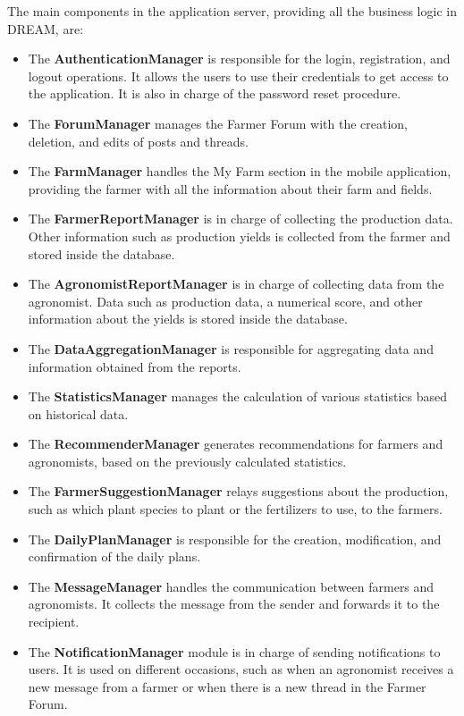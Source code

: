\noindent
The main components in the application server, providing all the business logic in DREAM, are:

\begin{itemize}
	\item The \textbf{AuthenticationManager} is responsible for the login, registration, and logout operations. It allows the users to use their credentials to get access to the application. It is also in charge of the password reset procedure.
	\item The \textbf{ForumManager} manages the Farmer Forum with the creation, deletion, and edits of posts and threads. 
	\item The \textbf{FarmManager} handles the My Farm section in the mobile application, providing the farmer with all the information about their farm and fields.
	\item The \textbf{FarmerReportManager} is in charge of collecting the production data. Other information such as production yields is collected from the farmer and stored inside the database.
	\item The \textbf{AgronomistReportManager} is in charge of collecting data from the agronomist. Data such as production data, a numerical score, and other information about the yields is stored inside the database.
	\item The \textbf{DataAggregationManager} is responsible for aggregating data and information obtained from the reports.
	\item The \textbf{StatisticsManager} manages the calculation of various statistics based on historical data.
	\item The \textbf{RecommenderManager} generates recommendations for farmers and agronomists, based on the previously calculated statistics.
	\item The \textbf{FarmerSuggestionManager} relays suggestions about the production, such as which plant species to plant or the fertilizers to use, to the farmers.
	\item The \textbf{DailyPlanManager} is responsible for the creation, modification, and confirmation of the daily plans.
	\item The \textbf{MessageManager} handles the communication between farmers and agronomists. It collects the message from the sender and forwards it to the recipient.
	\item The \textbf{NotificationManager} module is in charge of sending notifications to users. It is used on different occasions, such as when an agronomist receives a new message from a farmer or when there is a new thread in the Farmer Forum.

\end{itemize}
